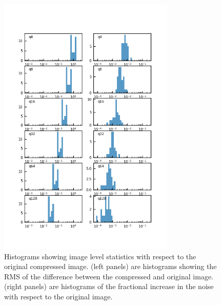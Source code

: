 \begin{figure}
\centering
\includegraphics[width=0.75\textwidth]{figure/compression_metric_v2.png}
\caption{Histograms showing image level statistics with respect to the original compressed image.
(left panels) are histograms showing the RMS of the difference between the compressed and original image. 
(right panels) are histograms of the fractional increase in the noise with respect to the original image.}
\label{image_difference}
\end{figure}


